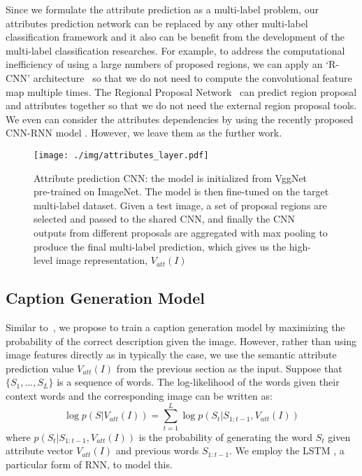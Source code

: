 \documentclass[10pt,journal,compsoc]{IEEEtran}
\def\Att{{V_{att}}}
\begin{document}
Since we formulate the attribute prediction as a multi-label problem, our attributes prediction network can be replaced by any other multi-label classification framework and it also can be benefit from the development of the multi-label classification researches. For example, to address the computational inefficiency of using a large numbers of proposed regions, we can apply an `R-CNN' architecture~\cite{girshick2015fast} so that we do not need to compute the convolutional feature map multiple times. The Regional Proposal Network~\cite{ren2015faster} can predict region proposal and attributes together so that we do not need the external region proposal tools. We even can consider the attributes dependencies by using the recently proposed CNN-RNN model \cite{wang2016cnn}. However, we leave them as the further work.

\begin{figure}[t!]
  \centering
  \texttt{[image: ./img/attributes\_layer.pdf]}\\
  \caption{Attribute prediction CNN: the model is initialized from VggNet~\cite{simonyan2014very} pre-trained on ImageNet. The model is then fine-tuned on the target multi-label dataset. Given a test image, a set of proposal regions are selected and passed to the shared CNN, and finally the CNN outputs from different proposals are aggregated with max pooling to produce the final multi-label prediction, which gives us the high-level image representation, $\Att(I)$}
  \label{img:attributes}
  \vspace{-10pt}
\end{figure}

\subsection{Caption Generation Model}
\label{subsec:caption_model}
Similar to~\cite{Karpathy2014deepvs,mao2014deep,vinyals2014show}, we propose to train a caption generation model by maximizing the probability of the correct description given the image. However, rather than using image features directly as in typically the case, we use the semantic attribute prediction value $\Att(I)$ from the previous section as the input. Suppose that $\{S_1,...,S_L\}$ is a sequence of words. The log-likelihood of the words given their context words and the corresponding image can be written as:
\begin{equation}
    \log p(S|\Att(I))=\sum_{t=1}^L \log p(S_{t}|S_{1:t-1},\Att(I))
\end{equation}
where $p(S_t|S_{1:t-1},\Att(I))$ is the probability of generating the word $S_t$ given attribute vector $\Att(I)$ and previous words $S_{1:t-1}$. We employ the LSTM \cite{hochreiter1997long}, a particular form of RNN, to model this.
\end{document}
